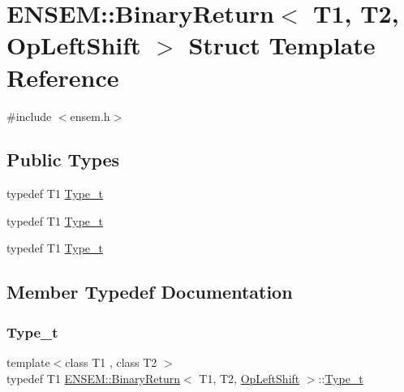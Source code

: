 \hypertarget{structENSEM_1_1BinaryReturn_3_01T1_00_01T2_00_01OpLeftShift_01_4}{}\section{E\+N\+S\+EM\+:\+:Binary\+Return$<$ T1, T2, Op\+Left\+Shift $>$ Struct Template Reference}
\label{structENSEM_1_1BinaryReturn_3_01T1_00_01T2_00_01OpLeftShift_01_4}


{\ttfamily \#include $<$ensem.\+h$>$}

\subsection*{Public Types}
\begin{DoxyCompactItemize}
\item 
typedef T1 \mbox{\hyperlink{structENSEM_1_1BinaryReturn_3_01T1_00_01T2_00_01OpLeftShift_01_4_a5b3c8cfdda3306ec2d9343185aba7e71}{Type\+\_\+t}}
\item 
typedef T1 \mbox{\hyperlink{structENSEM_1_1BinaryReturn_3_01T1_00_01T2_00_01OpLeftShift_01_4_a5b3c8cfdda3306ec2d9343185aba7e71}{Type\+\_\+t}}
\item 
typedef T1 \mbox{\hyperlink{structENSEM_1_1BinaryReturn_3_01T1_00_01T2_00_01OpLeftShift_01_4_a5b3c8cfdda3306ec2d9343185aba7e71}{Type\+\_\+t}}
\end{DoxyCompactItemize}


\subsection{Member Typedef Documentation}
\mbox{\label{structENSEM_1_1BinaryReturn_3_01T1_00_01T2_00_01OpLeftShift_01_4_a5b3c8cfdda3306ec2d9343185aba7e71}} 
\subsubsection{\texorpdfstring{Type\_t}{Type\_t}\hspace{0.1cm}{\footnotesize\ttfamily [1/3]}}
{\footnotesize\ttfamily template$<$class T1 , class T2 $>$ \\
typedef T1 \mbox{\hyperlink{structENSEM_1_1BinaryReturn}{E\+N\+S\+E\+M\+::\+Binary\+Return}}$<$ T1, T2, \mbox{\hyperlink{structENSEM_1_1OpLeftShift}{Op\+Left\+Shift}} $>$\+::\mbox{\hyperlink{structENSEM_1_1BinaryReturn_3_01T1_00_01T2_00_01OpLeftShift_01_4_a5b3c8cfdda3306ec2d9343185aba7e71}{Type\+\_\+t}}}

